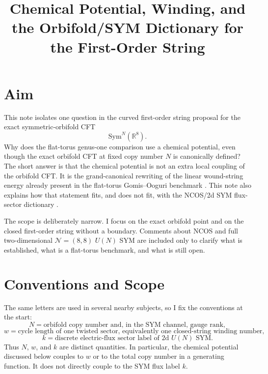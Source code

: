 \documentclass[11pt]{article}
\title{Chemical Potential, Winding, and the Orbifold/SYM Dictionary for the First-Order String}
\author{}
\date{}
\newcommand{\Sym}{\mathrm{Sym}}
\newcommand{\bR}{\mathbb{R}}
\begin{document}
\maketitle

\section{Aim}
This note isolates one question in the curved first-order string proposal for the exact symmetric-orbifold CFT
\begin{equation}\label{eq:aim-orbifold}
\Sym^N(\bR^8).
\end{equation}
Why does the flat-torus genus-one comparison use a chemical potential, even though the exact orbifold CFT at fixed copy number $N$ is canonically defined? The short answer is that the chemical potential is not an extra local coupling of the orbifold CFT. It is the grand-canonical rewriting of the linear wound-string energy already present in the flat-torus Gomis--Ooguri benchmark \cite{gomis2000nonrelativisticclosedstringtheory}. This note also explains how that statement fits, and does not fit, with the NCOS/2d SYM flux-sector dictionary \cite{seiberg2000stringsbackgroundelectricfield,klebanov200011dimensionalncosun,gopakumar2000sdualitynoncommutativegaugetheory}.

The scope is deliberately narrow. I focus on the exact orbifold point and on the closed first-order string without a boundary. Comments about NCOS and full two-dimensional $\mathcal N=(8,8)$ $U(N)$ SYM are included only to clarify what is established, what is a flat-torus benchmark, and what is still open.

\section{Conventions and Scope}
The same letters are used in several nearby subjects, so I fix the conventions at the start:
\begin{equation}\label{eq:main-conventions}
N=\text{orbifold copy number and, in the SYM channel, gauge rank},
\end{equation}
\begin{equation}\label{eq:w-convention}
w=\text{cycle length of one twisted sector, equivalently one closed-string winding number},
\end{equation}
\begin{equation}\label{eq:k-convention}
k=\text{discrete electric-flux sector label of 2d }U(N)\text{ SYM}.
\end{equation}
Thus $N$, $w$, and $k$ are distinct quantities. In particular, the chemical potential discussed below couples to $w$ or to the total copy number in a generating function. It does not directly couple to the SYM flux label $k$.
\end{document}
